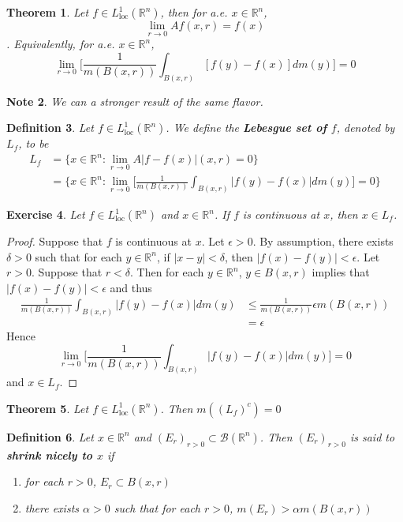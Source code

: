 \documentclass[12pt]{amsart}
\newtheorem{thm}{Theorem}[section]
\newtheorem{defn}[thm]{Definition}
\newtheorem{note}[thm]{Note}
\newtheorem{ex}[thm]{Exercise}
\newcommand{\al}{\alpha}
\newcommand{\del}{\delta}
\newcommand{\ep}{\epsilon}
\newcommand{\R}{\mathbb{R}}
\newcommand{\MB}{\mathcal{B}}
\newcommand{\Ll}{L^1_{\text{loc}}(\R^n)}
\begin{document}
\begin{thm}
Let $f \in \Ll$, then for a.e. $x \in \R^n$, $$\lim_{r \rightarrow 0} Af(x,r) =f(x)$$. Equivalently, for a.e. $x \in \R^n$, $$ \lim_{r \rightarrow 0} \bigg[ \frac{1}{m(B(x,r))}\int_{B(x,r)}[f(y)-f(x)]dm(y)\bigg] =0$$
\end{thm}

\begin{note}
We can a stronger result of the same flavor.
\end{note}

\begin{defn}
Let $f \in \Ll$. We define the \textbf{Lebesgue set of $f$}, denoted by $L_f$, to be 
\begin{align*}
L_f 
&= \{x \in \R^n: \lim_{r \rightarrow 0} A|f-f(x)|(x,r) =0 \}\\
&= \bigg \{x \in \R^n: \lim_{r \rightarrow 0} \bigg[ \frac{1}{m(B(x,r))}\int_{B(x,r)}|f(y) - f(x)|dm(y)\bigg] =0 \bigg \}
\end{align*}
\end{defn}

\begin{ex}
Let $f \in \Ll$ and $x \in \R^n$. If $f$ is continuous at $x$, then $x \in L_f$.
\end{ex}

\begin{proof}
Suppose that $f$ is continuous at $x$. Let $\ep > 0$. By assumption, there exists $\del >0$ such that for each $y \in \R^n$, if $|x-y|< \del$, then $|f(x)-f(y)| < \ep$. Let $r >0$. Suppose that $r< \del$. Then for each $y \in \R^n$, $y \in B(x,r)$ implies that $|f(x) - f(y)| < \ep$ and thus 
\begin{align*}
\frac{1}{m(B(x,r))}\int_{B(x,r)}|f(y) - f(x)|dm(y)
& \leq \frac{1}{m(B(x,r))} \ep m(B(x,r))\\
&=\ep
\end{align*}
Hence $$\lim_{r \rightarrow 0} \bigg[ \frac{1}{m(B(x,r))}\int_{B(x,r)}|f(y) - f(x)|dm(y)\bigg] =0$$ 
and $x \in L_f$.
\end{proof}

\begin{thm}
Let $f \in \Ll$. Then $m((L_f)^c) = 0$
\end{thm}

\begin{defn}
Let $x \in \R^n$ and $(E_r)_{r>0} \subset \MB(\R^n)$. Then $(E_r)_{r>0}$ is said to \textbf{shrink nicely to $x$} if 

\begin{enumerate}
\item for each $r>0$, $E_r \subset B(x,r)$
\item there exists $\al >0$ such that for each $r>0$, $m(E_r)> \al m(B(x,r))$
\end{enumerate} 
\end{defn}
\end{document}
